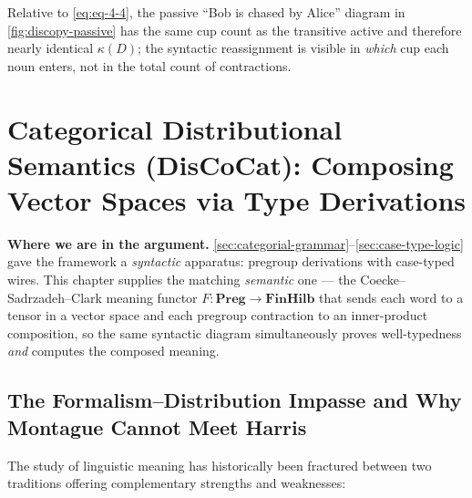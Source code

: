 \documentclass[
]{article}
\begin{document}
Relative to \autoref{eq:eq-4-4}, the passive ``Bob is chased by Alice''
diagram in \autoref{fig:discopy-passive} has the same cup count as the
transitive active and therefore nearly identical \(\kappa(D)\); the
syntactic reassignment is visible in \emph{which} cup each noun enters,
not in the total count of contractions.

\newpage

\section{Categorical Distributional Semantics (DisCoCat): Composing
Vector Spaces via Type Derivations}\label{sec:categorical-semantics}

\textbf{Where we are in the argument.}
\autoref{sec:categorial-grammar}--\autoref{sec:case-type-logic} gave the
framework a \emph{syntactic} apparatus: pregroup derivations with
case-typed wires. This chapter supplies the matching \emph{semantic} one
--- the Coecke--Sadrzadeh--Clark meaning functor
\(F \colon \mathbf{Preg} \to \mathbf{FinHilb}\) that sends each word to
a tensor in a vector space and each pregroup contraction to an
inner-product composition, so the same syntactic diagram simultaneously
proves well-typedness \emph{and} computes the composed meaning.

\subsection{The Formalism--Distribution Impasse and Why Montague Cannot
Meet
Harris}\label{the-formalismdistribution-impasse-and-why-montague-cannot-meet-harris}

The study of linguistic meaning has historically been fractured between
two traditions offering complementary strengths and weaknesses:
\end{document}
